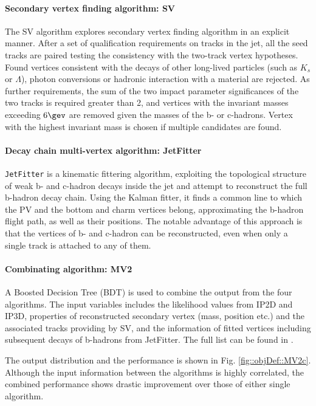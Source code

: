 \paragraph{Secondary vertex finding algorithm: SV}
The SV algorithm \cite{152_SV} explores secondary vertex finding algorithm in an explicit manner. 
After a set of qualification requirements on tracks in the jet, all the seed tracks are paired testing the consistency with the two-track vertex hypotheses. Found vertices consistent with the decays of other long-lived particles (such as $K_s$ or $\Lambda$), photon conversions or hadronic interaction with a material are rejected. As further requirements, the sum of the two impact parameter significances of the two tracks is required greater than 2, and vertices with the invariant masses exceeding $6 \gev$ are removed given the masses of the b- or c-hadrons. 
Vertex with the highest invariant mass is chosen if multiple candidates are found. %


\paragraph{Decay chain multi-vertex algorithm: JetFitter}
\texttt{JetFitter} \cite{153_JetFitter} is a kinematic fittering algorithm, exploiting the topological structure of weak b- and c-hadron decays inside the jet and attempt to reconstruct the full b-hadron decay chain. Using the Kalman fitter, it finds a common line to which the PV and the bottom and charm vertices belong, approximating the b-hadron flight path, as well as their positions. The notable advantage of this approach is that the vertices of b- and c-hadron can be reconstructed, even when only a single track is attached to any of them.

\paragraph{Combinating algorithm: MV2 }
A Boosted Decision Tree (BDT) is used to combine the output from the four algorithms.
The input variables includes
the likelihood values from IP2D and IP3D,
properties of reconstructed secondary vertex (mass, position etc.) and the associated tracks providing by SV,
and the information of fitted vertices including subsequent decays of b-hadrons from JetFitter.
The full list can be found in \cite{150_bTag_Run2_exp}.

The output distribution and the performance is shown in Fig. \ref{fig::objDef::MV2c}.
Although the input information between the algorithms is highly correlated, the combined performance shows drastic improvement over those of either single algorithm.

